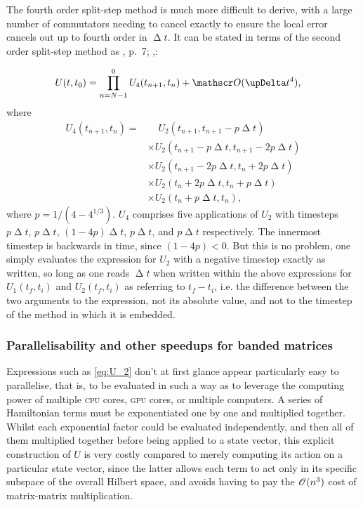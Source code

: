The fourth order split-step method is much more difficult to derive, with a large number of commutators needing to cancel exactly to ensure the local error cancels out up to fourth order in $\upDelta t$. It can be stated in terms of the second order split-step method as 
\citeleft{}, p.~7; ,\citeright:

\begin{align}
U(t, t_0) &= \prod_{n=N-1}^0 U_4(t_{n+1}, t_n) + \Ord{\upDelta t^4},
\end{align}
where
\begin{align}\label{eq:U_4}
U_4(t_{n+1}, t_n) =
&\phantom{\times}
U_2(t_{n+1}, t_{n+1} - p\upDelta t)\nonumber\\
&\times
U_2(t_{n+1} - p\upDelta t, t_{n+1} - 2p\upDelta t)\nonumber\\
&\times
U_2(t_{n+1} - 2p\upDelta t, t_n + 2p\upDelta t)\nonumber\\
&\times
U_2(t_n + 2p\upDelta t, t_n + p\upDelta t)\nonumber\\
&\times
U_2(t_n + p\upDelta t, t_n),
\end{align}
where $p = 1/(4 - 4^{1/3})$. $U_4$ comprises five applications of $U_2$ with timesteps $p\upDelta t$, $p\upDelta t$, $(1 - 4p)\upDelta t$, $p\upDelta t$, and $p\upDelta t$ respectively. The innermost timestep is backwards in time, since $(1 - 4p) < 0$. But this is no problem, one simply evaluates the expression for $U_2$ with a negative timestep exactly as written, so long as one reads $\upDelta t$ when written within the above expressions for $U_1(t_f, t_i)$ and $U_2(t_f, t_i)$ as referring to $t_f - t_i$, i.e. the difference between the two arguments to the expression, not its absolute value, and not to the timestep of the method in which it is embedded.

\subsubsection{Parallelisability and other speedups for banded matrices}\label{sec:split-step-parallel}

Expressions such as \eqref{eq:U_2} don't at first glance appear particularly easy to parallelise, that is, to be evaluated in such a way as to leverage the computing power of multiple \textsc{cpu} cores, \textsc{gpu} cores, or multiple computers. A series of Hamiltonian terms must be exponentiated one by one and multiplied together. Whilst each exponential factor could be evaluated independently, and then all of them multiplied together before being applied to a state vector, this explicit construction of $U$ is very costly compared to merely computing its action on a particular state vector, since the latter allows each term to act only in its specific subspace of the overall Hilbert space, and avoids having to pay the $\mathscr{O}(n^3)$ cost of matrix-matrix multiplication.

